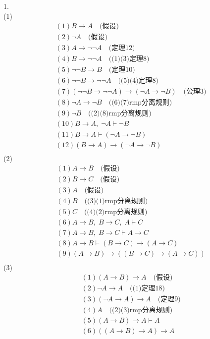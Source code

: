 \documentclass{article}
\begin{document}
1.\\
(1)
\[
\begin{aligned}
&(1)B \to A \quad \mbox{(假设)}\\
&(2)\neg A \quad \mbox{(假设)} \\
&(3)A \to \neg \neg A \quad \mbox{(定理12)} \\
&(4)B \to \neg \neg A \quad \mbox{((1)(3)定理8)} \\
&(5)\neg \neg B \to B \quad \mbox{(定理10)} \\
&(6)\neg \neg B \to \neg \neg A \quad \mbox{((5)(4)定理8)} \\
&(7)(\neg \neg B \to \neg \neg A) \to (\neg A \to \neg B) \quad \mbox{(公理3)} \\
&(8)\neg A \to \neg B \quad \mbox{((6)(7)rmp分离规则)} \\
&(9)\neg B \quad \mbox{((2)(8)rmp分离规则)} \\
&(10)B \to A,\; \neg A \vdash \neg B \\
&(11)B \to A \vdash (\neg A \to \neg B) \\
&(12)(B \to A) \to (\neg A \to \neg B) \\
\end{aligned}
\]
(2)
\[
\begin{aligned}
&(1)A \to B \quad \mbox{(假设)}\\
&(2)B \to C \quad \mbox{(假设)} \\
&(3)A \quad \mbox{(假设)} \\
&(4)B \quad \mbox{((3)(1)rmp分离规则)} \\
&(5)C \quad \mbox{((4)(2)rmp分离规则)} \\
&(6)A \to B,\; B \to C,\; A \vdash C \\
&(7)A \to B,\; B \to C \vdash A \to C \\
&(8)A \to B \vdash (B \to C) \to (A \to C) \\
&(9)(A \to B) \to ((B \to C) \to (A \to C)) \\
\end{aligned}
\]
(3)
\[
\begin{aligned}
&(1)(A \to B) \to A \quad \mbox{(假设)}\\
&(2)\neg A \to A \quad \mbox{((1)定理18)} \\
&(3)(\neg A \to A) \to A \quad \mbox{(定理9)} \\
&(4)A \quad \mbox{((2)(3)rmp分离规则)} \\
&(5)(A \to B) \to A \vdash A \\
&(6)((A \to B) \to A) \to A \\
\end{aligned}
\]
\end{document}
